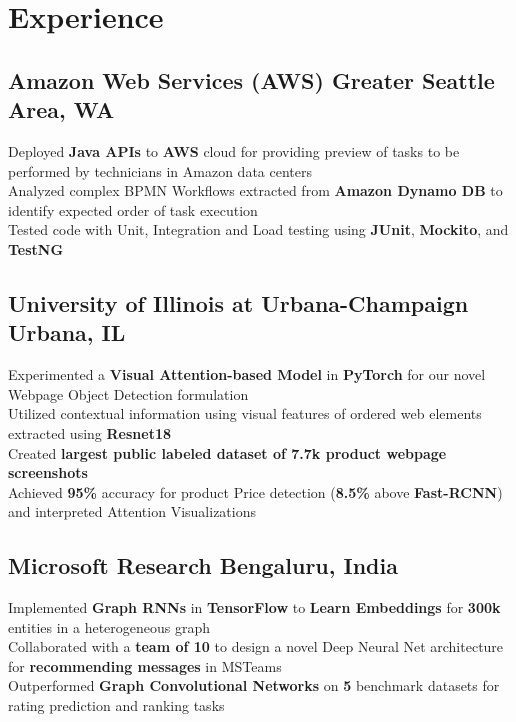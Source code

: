 \documentclass[]{Keval-resume}
\begin{document}
\section{Experience} 
\hrulefill
\postsectionsep 

\subsection{Amazon Web Services (AWS) \hfill \normalfont Greater Seattle Area, WA}
\textbullet{} Deployed \textbf{Java APIs} to \textbf{AWS} cloud for providing preview of tasks to be performed by technicians in Amazon data centers \\
\textbullet{} Analyzed complex BPMN Workflows extracted from \textbf{Amazon Dynamo DB} to identify expected order of task execution \\
\textbullet{} Tested code with Unit, Integration and Load testing using \textbf{JUnit}, \textbf{Mockito}, and \textbf{TestNG}
\sectionsep

\subsection{University of Illinois at Urbana-Champaign \hfill \normalfont Urbana, IL}
\textbullet{} Experimented a \textbf{Visual Attention-based Model} in \textbf{PyTorch} for our novel Webpage Object Detection formulation \\
\textbullet{} Utilized contextual information using visual features of ordered web elements extracted using \textbf{Resnet18} \\  
\textbullet{} Created \textbf{largest public labeled dataset of 7.7k product webpage screenshots} \\
\textbullet{} Achieved \textbf{95\%} accuracy for product Price detection (\textbf{8.5\%} above \textbf{Fast-RCNN}) and interpreted Attention Visualizations
\sectionsep

\subsection{Microsoft Research \hfill \normalfont Bengaluru, India}
\textbullet{} Implemented \textbf{Graph RNNs} in \textbf{TensorFlow} to \textbf{Learn Embeddings} for \textbf{300k} entities in a heterogeneous graph \\
\textbullet{} Collaborated with a \textbf{team of 10} to design a novel Deep Neural Net architecture for \textbf{recommending messages} in MSTeams \\
\textbullet{} Outperformed \textbf{Graph Convolutional Networks} on \textbf{5} benchmark datasets for rating prediction and ranking tasks
\sectionsep
\end{document}
